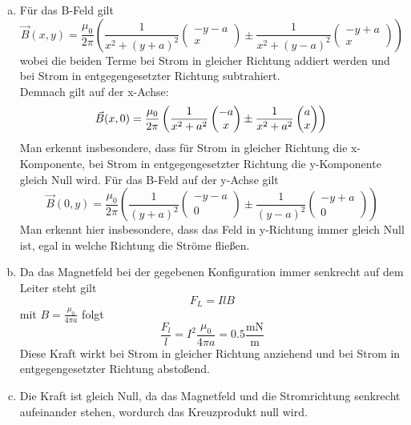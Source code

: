 \begin{enumerate}[(a)]
\item Für das B-Feld gilt
\begin{equation}
  \vec B(x,y)=\frac{\mu_0}{2\pi}\left(\frac{1}{x^2+(y+a)^2}\begin{pmatrix}-y-a \\x\end{pmatrix}\pm \frac{1}{x^2+(y-a)^2}\begin{pmatrix}-y+a \\x\end{pmatrix}\right)
\end{equation}
wobei die beiden Terme bei Strom in gleicher Richtung addiert werden und bei Strom in entgegengesetzter Richtung subtrahiert.\\
Demnach gilt auf der x-Achse:
\begin{equation}
  \vec B(x,0)=\frac{\mu_0}{2\pi}\left(\frac{1}{x^2+a^2}\begin{pmatrix}-a \\x\end{pmatrix}\pm \frac{1}{x^2+a^2}\begin{pmatrix}a \\x\end{pmatrix}\right)\\
\end{equation}
Man erkennt insbesondere, dass für Strom in gleicher Richtung die x-Komponente, bei Strom in entgegengesetzter Richtung die y-Komponente gleich Null wird.
Für das B-Feld auf der y-Achse gilt
\begin{equation}
  \vec B(0,y)=\frac{\mu_0}{2\pi}\left(\frac{1}{(y+a)^2}\begin{pmatrix}-y-a \\0\end{pmatrix}\pm \frac{1}{(y-a)^2}\begin{pmatrix}-y+a \\0\end{pmatrix}\right)
\end{equation}
Man erkennt hier insbesondere, dass das Feld in y-Richtung immer gleich Null ist, egal in welche Richtung die Ströme fließen.

\item Da das Magnetfeld bei der gegebenen Konfiguration immer senkrecht auf dem Leiter steht gilt
\begin{equation}
  F_L=IlB
\end{equation}
mit $B=\frac{\mu_0}{4\pi a}$ folgt
\begin{equation}
  \frac{F_l}{l}=I^2 \frac{\mu_0}{4\pi a}=0.5\frac{\mathrm{mN}}{\mathrm{m}}
\end{equation}
Diese Kraft wirkt bei Strom in gleicher Richtung anziehend und bei Strom in entgegengesetzter Richtung abstoßend.

\item Die Kraft ist gleich Null, da das Magnetfeld und die Stromrichtung senkrecht aufeinander stehen, wordurch das Kreuzprodukt null wird.

\end{enumerate}